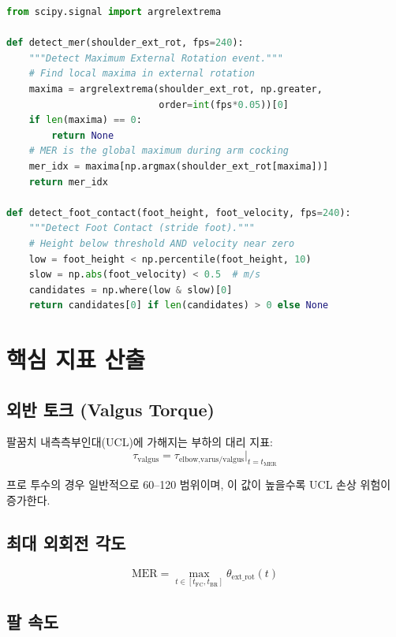 \documentclass[11pt, a4paper]{report}
\begin{document}
\begin{codebox}[title={이벤트 검출 알고리즘}]
\begin{lstlisting}[language=Python]
from scipy.signal import argrelextrema

def detect_mer(shoulder_ext_rot, fps=240):
    """Detect Maximum External Rotation event."""
    # Find local maxima in external rotation
    maxima = argrelextrema(shoulder_ext_rot, np.greater,
                           order=int(fps*0.05))[0]
    if len(maxima) == 0:
        return None
    # MER is the global maximum during arm cocking
    mer_idx = maxima[np.argmax(shoulder_ext_rot[maxima])]
    return mer_idx

def detect_foot_contact(foot_height, foot_velocity, fps=240):
    """Detect Foot Contact (stride foot)."""
    # Height below threshold AND velocity near zero
    low = foot_height < np.percentile(foot_height, 10)
    slow = np.abs(foot_velocity) < 0.5  # m/s
    candidates = np.where(low & slow)[0]
    return candidates[0] if len(candidates) > 0 else None
\end{lstlisting}
\end{codebox}

\section{핵심 지표 산출}

\subsection{외반 토크 (Valgus Torque)}

팔꿈치 내측측부인대(UCL)에 가해지는 부하의 대리 지표:
\begin{equation}
  \tau_{\text{valgus}} = \tau_{\text{elbow,varus/valgus}} \bigg|_{t = t_{\text{MER}}}
\end{equation}

프로 투수의 경우 일반적으로 60--120\Nm{} 범위이며,
이 값이 높을수록 UCL 손상 위험이 증가한다.

\subsection{최대 외회전 각도}

\begin{equation}
  \text{MER} = \max_{t \in [t_{\text{FC}}, t_{\text{BR}}]} \theta_{\text{ext\_rot}}(t)
\end{equation}

\subsection{팔 속도}
\end{document}
